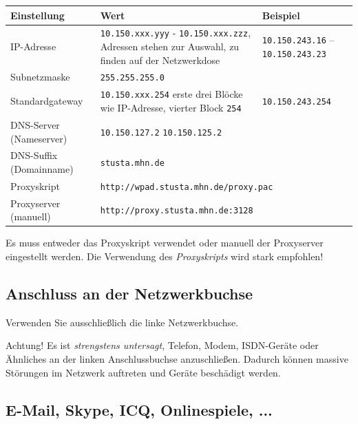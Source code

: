 \documentclass[a4paper,12pt]{scrartcl}
\begin{document}
\begin{center}
  \begin{tabularx}{\linewidth}{|lXp{.2\linewidth}|}
    \hline
    Einstellung & Wert & Beispiel \\
    \hline \hline
    IP-Adresse & \nolinkurl{10.150.xxx.yyy} - \nolinkurl{10.150.xxx.zzz}, \newline 8 Adressen stehen zur Auswahl, zu finden auf der Netzwerkdose & \nolinkurl{10.150.243.16} – \nolinkurl{10.150.243.23} \\
    \hline
    Subnetzmaske & \nolinkurl{255.255.255.0} & \\
    \hline
    Standardgateway & \nolinkurl{10.150.xxx.254} \newline erste drei Blöcke wie IP-Adresse, vierter Block \nolinkurl{254} & \nolinkurl{10.150.243.254} \\
    \hline
    DNS-Server (Nameserver) & \nolinkurl{10.150.127.2} \newline \nolinkurl{10.150.125.2} & \\
    \hline
    DNS-Suffix (Domainname) & \nolinkurl{stusta.mhn.de} & \\
    \hline
    Proxyskript & \multicolumn{2}{l|}{\nolinkurl{http://wpad.stusta.mhn.de/proxy.pac}} \\
    \hline
    Proxyserver (manuell) & \multicolumn{2}{l|}{\nolinkurl{http://proxy.stusta.mhn.de:3128}} \\
    \hline
  \end{tabularx}
\end{center}

Es muss entweder das Proxyskript verwendet oder manuell der Proxyserver eingestellt werden. Die Verwendung des \emph{Proxyskripts} wird stark empfohlen!

\subsection*{Anschluss an der Netzwerkbuchse}

Verwenden Sie ausschließlich die linke Netzwerkbuchse. 

Achtung! Es ist \emph{strengstens untersagt}, Telefon, Modem, ISDN-Geräte oder Ähnliches an der linken Anschlussbuchse anzuschließen. Dadurch können massive Störungen im Netzwerk auftreten und Geräte beschädigt werden. 

\subsection*{E-Mail, Skype, ICQ, Onlinespiele, ...}
\end{document}
